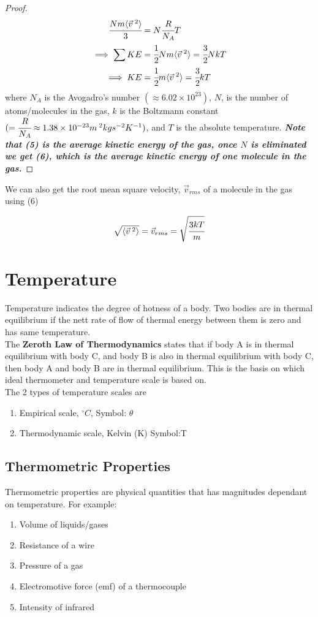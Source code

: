 \documentclass{article}
\begin{document}
\begin{proof}
\begin{align}
    \cfrac{Nm\langle {\vec{v}}^{\;2} \rangle}{3}&= N\cfrac{R}{N_A}T \nonumber\\
    \implies \sum KE&=\cfrac{1}{2}Nm\langle {\vec{v}}^{\;2}\rangle=\cfrac{3}{2}NkT\\
    \implies KE&= \cfrac{1}{2}m\langle {\vec{v}}^{\;2} \rangle=\cfrac{3}{2}kT 
\end{align}
where $N_A$ is the Avogadro's number $(\approx 6.02\times 10^{23})$, $N$, is the number of atoms/molecules in the gas, $k$ is the Boltzmann constant $(=\cfrac{R}{N_A}\approx 1.38\times 10^{-23} m^{\;2} kg s^{-2}K^{-1})$, and $T$ is the absolute temperature. \textbf{\textit{Note that (5) is the average kinetic energy of the gas, once $N$ is eliminated we get (6), which is the average kinetic energy of one molecule in the gas.}}
\end{proof}

We can also get the root mean square velocity, $\vec{v}_{rms}$ of a molecule in the gas using (6)

$$\sqrt{\langle \vec{v}^{\; 2} \rangle }=\vec{v}_{rms}=\sqrt{\cfrac{3kT}{m}} $$

\newpage
\section{Temperature}
Temperature indicates the degree of hotness of a body. Two bodies are in thermal equilibrium if the nett rate of flow of thermal energy between them is zero and has same temperature.
\\The \textbf{Zeroth Law of Thermodynamics} states that if body A is in thermal equilibrium with body C, and body B is also in thermal equilibrium with body C, then body A and body B are in thermal equilibrium. This is the basis on which ideal thermometer and temperature scale is based on.
\\The 2 types of temperature scales are 
\begin{enumerate}
    \item Empirical scale, $^\circ C$, Symbol: $\theta$
    \item Thermodynamic scale, Kelvin (K) Symbol:T
\end{enumerate}


\subsection{Thermometric Properties}

Thermometric properties are physical quantities that has magnitudes dependant on temperature. For example:
\begin{enumerate}
    \item Volume of liquids/gases
    \item Resistance of a wire
    \item Pressure of a gas
    \item Electromotive force (emf) of a thermocouple
    \item Intensity of infrared
\end{enumerate}
\end{document}
